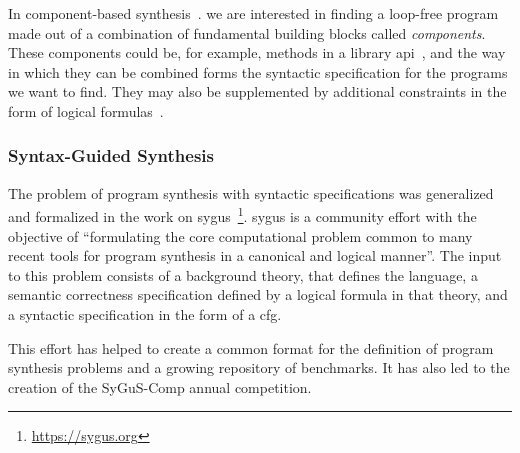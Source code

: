 In component-based
synthesis~\cite{Shi:2019:FCS,Feng:2018:PSU,Feng:2017:CST,Feng:2017:CSC,Jha:oracle:2010}.
we are interested in finding a loop-free program made out of a combination of
fundamental building blocks called \textit{components}. These components could
be, for example, methods in a library
\gls{api}~\cite{Shi:2019:FCS,Feng:2017:CSC}, and the way in which they can be
combined forms the syntactic specification for the programs we want to find.
They may also be supplemented by additional constraints in the form of logical
formulas~\cite{Feng:2018:PSU}.

\subsubsection{Syntax-Guided Synthesis}
\label{sec:sygus}

The problem of program synthesis with syntactic specifications was generalized
and formalized in the work on
\gls{sygus}~\cite{Alur:sygus:2013}\footnote{\url{https://sygus.org}}.
\gls{sygus} is a community effort with the objective of ``formulating the core
computational
problem common to many recent tools for program synthesis in a canonical and
logical manner''. The input to this problem consists of a background theory,
that defines the language, a semantic correctness specification defined by a
logical formula in that theory, and a syntactic specification in the form of a
\gls{cfg}.

This effort has helped to create a common format for the definition of program
synthesis problems and a growing repository of benchmarks. It has also led to
the creation of the SyGuS-Comp annual competition.